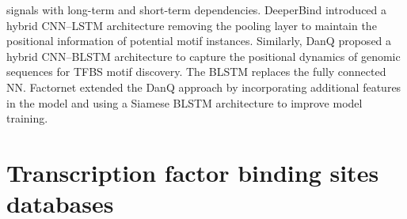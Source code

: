 \documentclass[a4paper, titlepage, openright]{book}
\begin{document}
signals with long-term and short-term dependencies. DeeperBind \citep{hassanzadeh2016deeperbind}  introduced a hybrid CNN–LSTM architecture removing the pooling layer to maintain the positional information of potential motif instances. Similarly, DanQ  \citep{quang2016danq}  proposed a hybrid CNN–BLSTM architecture to capture the positional dynamics of genomic sequences for TFBS motif discovery. The BLSTM replaces the fully connected NN. Factornet \citep{quang2019factornet} extended the DanQ approach by incorporating additional features in the model and using a Siamese BLSTM architecture to improve model training.

\section{Transcription factor binding sites databases}
\end{document}
